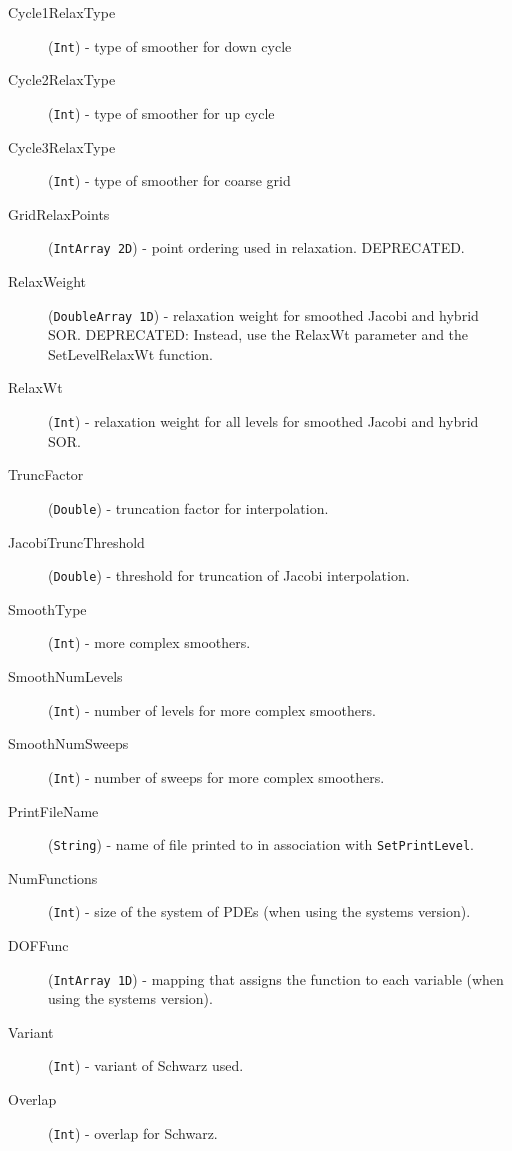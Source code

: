 \documentclass{article}
\begin{document}
\begin{cxxentry}
\begin{cxxentry}
\begin{cxxvariable}
\begin{cxxdoc}
\begin{description}
\item[Cycle1RelaxType] ({\tt Int}) - type of smoother for down cycle

\item[Cycle2RelaxType] ({\tt Int}) - type of smoother for up cycle

\item[Cycle3RelaxType] ({\tt Int}) - type of smoother for coarse grid

\item[GridRelaxPoints] ({\tt IntArray 2D}) - point ordering used in
relaxation.  DEPRECATED.

\item[RelaxWeight] ({\tt DoubleArray 1D}) - relaxation weight for
smoothed Jacobi and hybrid SOR.  DEPRECATED:
Instead, use the RelaxWt parameter and the SetLevelRelaxWt function.

\item[RelaxWt] ({\tt Int}) - relaxation weight for all levels for
smoothed Jacobi and hybrid SOR.

\item[TruncFactor] ({\tt Double}) - truncation factor for
interpolation.

\item[JacobiTruncThreshold] ({\tt Double}) - threshold for truncation
of Jacobi interpolation.

\item[SmoothType] ({\tt Int}) - more complex smoothers.

\item[SmoothNumLevels] ({\tt Int}) - number of levels for more
complex smoothers.

\item[SmoothNumSweeps] ({\tt Int}) - number of sweeps for more
complex smoothers.

\item[PrintFileName] ({\tt String}) - name of file printed to in
association with {\tt SetPrintLevel}.

\item[NumFunctions] ({\tt Int}) - size of the system of PDEs
(when using the systems version).

\item[DOFFunc] ({\tt IntArray 1D}) - mapping that assigns the
function to each variable (when using the systems version).

\item[Variant] ({\tt Int}) - variant of Schwarz used.

\item[Overlap] ({\tt Int}) - overlap for Schwarz.


\end{description}
\end{cxxdoc}
\end{cxxvariable}
\end{cxxentry}
\end{cxxentry}
\end{document}
